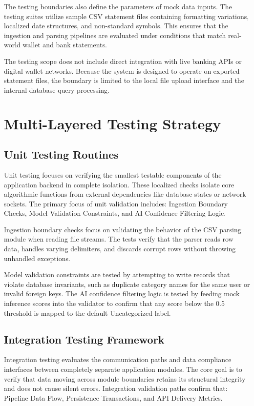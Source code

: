 The testing boundaries also define the parameters of mock data inputs. The testing suites utilize sample CSV statement files containing formatting variations, localized date structures, and non-standard symbols. This ensures that the ingestion and parsing pipelines are evaluated under conditions that match real-world wallet and bank statements.

The testing scope does not include direct integration with live banking APIs or digital wallet networks. Because the system is designed to operate on exported statement files, the boundary is limited to the local file upload interface and the internal database query processing.

\section{Multi-Layered Testing Strategy}
\subsection{Unit Testing Routines}
Unit testing focuses on verifying the smallest testable components of the application backend in complete isolation. These localized checks isolate core algorithmic functions from external dependencies like database states or network sockets. The primary focus of unit validation includes: Ingestion Boundary Checks, Model Validation Constraints, and AI Confidence Filtering Logic.

Ingestion boundary checks focus on validating the behavior of the CSV parsing module when reading file streams. The tests verify that the parser reads row data, handles varying delimiters, and discards corrupt rows without throwing unhandled exceptions.

Model validation constraints are tested by attempting to write records that violate database invariants, such as duplicate category names for the same user or invalid foreign keys. The AI confidence filtering logic is tested by feeding mock inference scores into the validator to confirm that any score below the 0.5 threshold is mapped to the default Uncategorized label.

\subsection{Integration Testing Framework}
Integration testing evaluates the communication paths and data compliance interfaces between completely separate application modules. The core goal is to verify that data moving across module boundaries retains its structural integrity and does not cause silent errors. Integration validation paths confirm that: Pipeline Data Flow, Persistence Transactions, and API Delivery Metrics.

